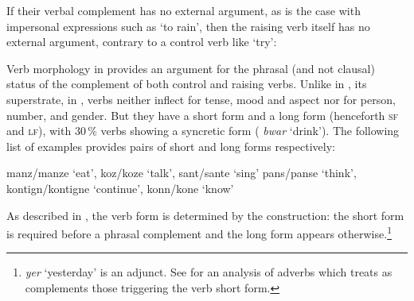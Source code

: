 \eal
{}
\zl
 
If their verbal complement has no external argument, as is the case with impersonal expressions such as  `to rain', then the raising verb itself has no external argument, contrary to a control verb like  `try':

\eal
{}
\zl

Verb morphology in  provides an argument for the phrasal (and not clausal) status of the complement of both control and raising verbs. Unlike in , its superstrate, in ,  verbs neither inflect for tense, mood and aspect nor for person, number, and
gender. But they have a short form and a long form (henceforth \textsc{sf} and \textsc{lf}), with
30\,\% verbs showing a syncretic form ( \emph{bwar} `drink'). The following list of examples provides pairs of short and
long forms respectively:

\eal
\ex manz/manze `eat', koz/koze `talk', sant/sante `sing'
\ex pans/panse `think', kontign/kontigne `continue', konn/kone `know'
\zl

As described in \citet{Henri2010}\addpages, the verb form is determined by the construction: the
short form is required before a phrasal complement and the long form appears otherwise.\footnote{\textit{yer} `yesterday' is an adjunct. See  for an analysis of  adverbs which treats as complements those triggering the verb short form.}


